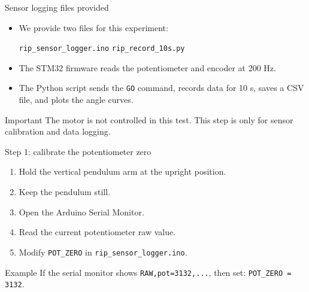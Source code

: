 \documentclass[aspectratio=169]{beamer}
\begin{document}
\begin{frame}{Sensor logging files provided}

\begin{itemize}
    \item We provide two files for this experiment:
    \vspace{0.25cm}

    \begin{center}
    \texttt{rip\_sensor\_logger.ino}
    \qquad
    \texttt{rip\_record\_10s.py}
    \end{center}

    \vspace{0.25cm}

    \item The STM32 firmware reads the potentiometer and encoder at 200 Hz.
    \vspace{0.25cm}

    \item The Python script sends the \texttt{GO} command, records data for 10 s,
    saves a CSV file, and plots the angle curves.
\end{itemize}

\vspace{0.25cm}

\begin{alertblock}{Important}
\small
The motor is not controlled in this test. This step is only for sensor calibration and data logging.
\end{alertblock}

\end{frame}


\begin{frame}{Step 1: calibrate the potentiometer zero}

\begin{enumerate}
    \item Hold the vertical pendulum arm at the upright position.
    \vspace{0.3cm}

    \item Keep the pendulum still.
    \vspace{0.3cm}

    \item Open the Arduino Serial Monitor.
    \vspace{0.3cm}

    \item Read the current potentiometer raw value.
    \vspace{0.3cm}

    \item Modify \texttt{POT\_ZERO} in \texttt{rip\_sensor\_logger.ino}.
\end{enumerate}

\vspace{0.25cm}

\begin{block}{Example}
\small
If the serial monitor shows \texttt{RAW,pot=3132,...}, then set:
\texttt{POT\_ZERO = 3132}.
\end{block}

\end{frame}
\end{document}
